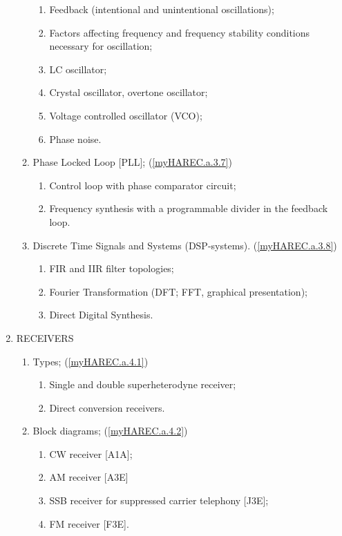 \begin{enumerate}
\begin{enumerate}[noitemsep]
\begin{enumerate}[noitemsep]
\item Feedback (intentional and unintentional oscillations);
\item Factors affecting frequency and frequency stability conditions necessary for oscillation;
\item LC oscillator;
\item Crystal oscillator, overtone oscillator;
\item Voltage controlled oscillator (VCO);
\item Phase noise.
\end{enumerate}
\item Phase Locked Loop [PLL]; (\ref{myHAREC.a.3.7})\label{HAREC.a.3.7}
\begin{enumerate}[noitemsep]
\item Control loop with phase comparator circuit;
\item Frequency synthesis with a programmable divider in the feedback loop.
\end{enumerate}
\item Discrete Time Signals and Systems (DSP-systems). (\ref{myHAREC.a.3.8})\label{HAREC.a.3.8}
\begin{enumerate}[noitemsep]
\item FIR and IIR filter topologies;
\item Fourier Transformation (DFT; FFT, graphical presentation);
\item Direct Digital Synthesis.
\end{enumerate}
\end{enumerate}
\item RECEIVERS
\begin{enumerate}[noitemsep]
\item Types; (\ref{myHAREC.a.4.1})\label{HAREC.a.4.1}
\begin{enumerate}[noitemsep]
\item Single and double superheterodyne receiver;
\item Direct conversion receivers.
\end{enumerate}
\item Block diagrams; (\ref{myHAREC.a.4.2})\label{HAREC.a.4.2}
\begin{enumerate}[noitemsep]
\item CW receiver [A1A];
\item AM receiver [A3E]
\item SSB receiver for suppressed carrier telephony [J3E];
\item FM receiver [F3E].
\end{enumerate}

\end{enumerate}
\end{enumerate}
